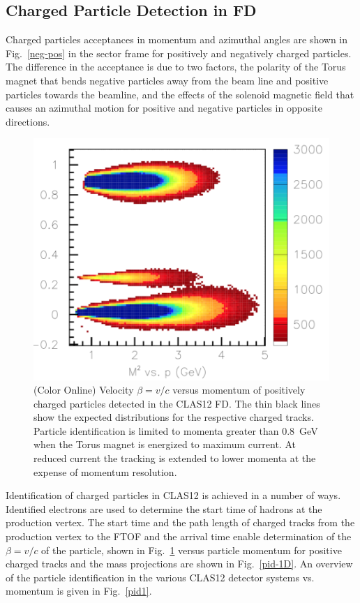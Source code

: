 \documentclass[final,3p,twocolumn]{elsarticle}
\begin{document}
\subsection{Charged Particle Detection in FD}
 
Charged particles acceptances in momentum and azimuthal angles are shown in Fig.~\ref{neg-pos} in the sector
frame for positively and negatively charged particles. The difference in the acceptance is due to two factors, the
polarity of the Torus magnet that bends negative particles away from the beam line and positive particles towards
the beamline, and the effects of the solenoid magnetic field that causes an azimuthal motion for positive and negative
particles in opposite directions. 

\begin{figure}[htbp!]
\centerline{\includegraphics[width=1.1\columnwidth]{FTOF1b_M2-vs-p.png}}
\caption{(Color Online) Velocity $\beta = v/c $ versus momentum of positively charged particles detected in the CLAS12 FD. The
thin black lines show the expected distributions for the respective charged tracks. Particle identification is limited
to momenta greater than 0.8~GeV when the Torus magnet is energized to maximum current. At reduced current the
tracking is extended to lower momenta at the expense of momentum resolution.}
\label{pid}
\end{figure} 

Identification of charged particles in CLAS12 is achieved in a number of ways. Identified electrons are used to
determine the start time of hadrons at the production vertex. The start time and the path length of charged tracks
from the production vertex to the FTOF and the arrival time enable determination of the $\beta = v/c$ of the
particle, shown in Fig.~\ref{pid} versus particle momentum for positive charged tracks and the mass projections are
shown in Fig.~\ref{pid-1D}.  An overview of the particle identification in the various CLAS12 detector systems vs.
momentum is given in Fig.~\ref{pid1}. 
\end{document}
